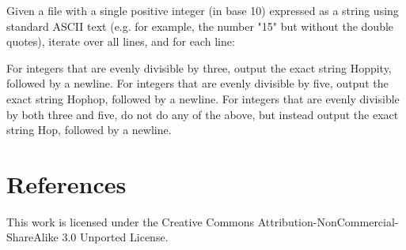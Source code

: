 \documentclass[draft=false]{article}
\begin{document}
Given a file with a single positive integer (in base 10) expressed as a string using standard ASCII text (e.g. for example, the number "15" but without the double quotes), iterate over all lines, and for each line:

For integers that are evenly divisible by three, output the exact string Hoppity, followed by a newline.
For integers that are evenly divisible by five, output the exact string Hophop, followed by a newline.
For integers that are evenly divisible by both three and five, do not do any of the above, but instead output the exact string Hop, followed by a newline.

\section*{References}


This work is licensed under the Creative Commons Attribution-NonCommercial-ShareAlike 3.0 Unported License.
\end{document}

